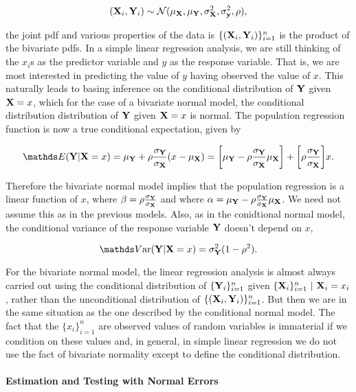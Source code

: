 \documentclass{homework}
\begin{document}
$$
({\bf X}_i, {\bf Y}_i) \sim \mathcal{N}(\mu_{\bf X}, \mu_{\bf Y}, \sigma^2_{\bf X}, \sigma^2_{\bf y}, \rho),
$$

the joint pdf and various properties of the data is $\{({\bf X}_i, {\bf Y}_i)\}_{i=1}^n$ is the product of the bivariate pdfs. In a simple linear regression analysis, we are still thinking of the $x_i$s as the predictor variable and $y$ as the response variable. That is, we are most interested in predicting the value of $y$ having observed the value of $x$. This naturally leads to basing inference on the conditional distribution of ${\bf Y}$ given ${\bf X} = x$, which for the case of a bivariate normal model, the conditional distribution distribution of ${\bf Y}$ given ${\bf X} = x$ is normal. The population regression function is now a true conditional expectation, given by

$$
\E(\Y|\X = x) = \mu_{\Y} + \rho \frac{\sigma_{\Y}}{\sigma_\X} (x-\mu_\X) = \bigg[\mu_\Y - \rho \frac{\sigma_{\Y}}{\sigma_\X} \mu_\X \bigg] + \bigg[ \rho \frac{\sigma_{\Y}}{\sigma_\X}\bigg]x.
$$

Therefore the bivariate normal model implies that the population regression is a linear function of $x$, where $\beta = \rho \frac{\sigma_{{\bf Y}}}{\sigma_{\bf X}}$ and where $\alpha = \mu_{\bf Y} - \rho \frac{\sigma_{{\bf Y}}}{\sigma_{\bf X}} \mu_{\bf X}$. We need not assume this as in the previous models. Also, as in the conidtional normal model, the conditional variance of the response variable ${\bf Y}$ doesn't depend on $x$,

$$
\var(\Y|\X = x) = \sigma^2_\Y (1-\rho^2).
$$

For the bivariate normal model, the linear regression analysis is almost always carried out using the conditional distribution of $\{{\bf Y}_i\}_{i=1}^n$ 
given $\{{\bf X}_i\}_{i=1}^n \textnormal{ } |\textnormal{ } {\bf X}_i = x_i $, rather than the unconditional distribution of $\{({\bf X}_i, {\bf Y}_i)\}_{i=1}^n$. But then we are in the same situation as the one described by the conditional normal model. The fact that the $\{x_i\}_{i=1}^{n}$ are observed values of random variables is immaterial if we condition on these values and, in general, in simple linear regression we do not use the fact of bivariate normality except to define the conditional distribution. \\

\paragraph{\textbf{Estimation and Testing with Normal Errors}}
\end{document}
